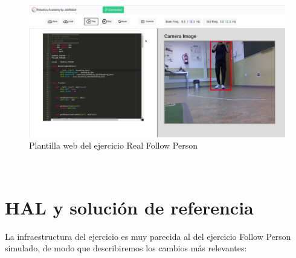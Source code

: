 \begin{figure} [H]
	\begin{center}
		\includegraphics[width=12cm]{imagenes/cap6/plantilla-web.png}
	\end{center}
	\caption[Plantilla web del ejercicio Real Follow Person]{Plantilla web del ejercicio Real Follow Person}
	\label{fig:plantilla_web_real_follow_person}
\end{figure}\




\section{HAL y solución de referencia}
\label{sec:hal_solucion_real_follow_person}

La infraestructura del ejercicio es muy parecida al del ejercicio Follow Person simulado, de modo que describiremos los cambios más relevantes:

